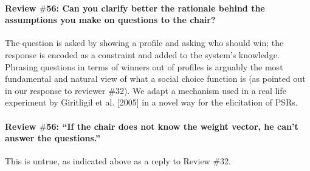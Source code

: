 \documentclass{article}
\begin{document}
\paragraph{Review $\#$56: Can you clarify better the rationale behind the assumptions you make on questions to the chair?}
The question is asked by showing a profile and asking who should win; the response is encoded as a constraint and added to the system’s knowledge. Phrasing questions in terms of winners out of profiles is arguably the most fundamental and natural view of what a social choice function is (as pointed out in our response to reviewer $\#$32). We adapt a mechanism used in a real life experiment by Giritligil et al. [2005] in a novel way for the elicitation of PSRs.

\paragraph{Review $\#$56: “If the chair does not know the weight vector, he can’t answer the questions.”}
This is untrue, as indicated above as a reply to Review \#32.
\end{document}
